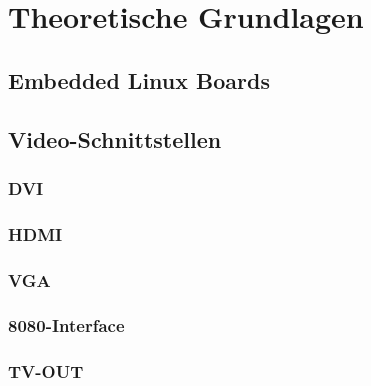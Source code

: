 \chapter{Theoretische Grundlagen}
\label{cha:Grundlagen}

\section{Embedded Linux Boards}

\section{Video-Schnittstellen}
\subsection{DVI}
\subsection{HDMI}
\subsection{VGA}
\subsection{8080-Interface}
\subsection{TV-OUT}